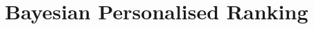 \documentclass[a4paper, 11pt, fleqn]{article}
\begin{document}
\section{Bayesian Personalised Ranking}




\end{document}
